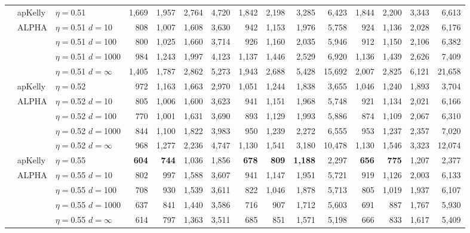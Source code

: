 \documentclass[aoas]{imsart}
\begin{document}
\begin{table}
\begin{tabular}{lll|rrrr|rrrr|rrrr}
\cline{2-15} & apKelly & $\eta=$0.51 & 1,669  & 1,957  & 2,764  & 4,720  & 1,842  & 2,198  & 3,285  & 6,423  & 1,844  & 2,200  & 3,343  & 6,613  \\
\cline{2-15}
& ALPHA & $\eta=$0.51 $d=$10 & 808  & 1,007  & 1,608  & 3,630  & 942  & 1,153  & 1,976  & 5,758  & 924  & 1,136  & 2,028  & 6,176  \\
&  & $\eta=$0.51 $d=$100 & 800  & 1,025  & 1,660  & 3,714  & 926  & 1,160  & 2,035  & 5,946  & 912  & 1,150  & 2,106  & 6,382  \\
&  & $\eta=$0.51 $d=$1000 & 984  & 1,243  & 1,997  & 4,123  & 1,137  & 1,446  & 2,529  & 6,920  & 1,136  & 1,439  & 2,626  & 7,409  \\
 &  & $\eta=$0.51 $d=\infty$ & 1,405  & 1,787  & 2,862  & 5,273  & 1,943  & 2,688  & 5,428  & 15,692  & 2,007  & 2,825  & 6,121  & 21,658  \\
\cline{2-15} & apKelly & $\eta=$0.52 & 972  & 1,163  & 1,663  & 2,970  & 1,051  & 1,244  & 1,838  & 3,655  & 1,046  & 1,240  & 1,893  & 3,704  \\
\cline{2-15}
& ALPHA & $\eta=$0.52 $d=$10 & 805  & 1,006  & 1,600  & 3,623  & 941  & 1,151  & 1,968  & 5,748  & 921  & 1,134  & 2,021  & 6,166  \\
&  & $\eta=$0.52 $d=$100 & 770  & 1,001  & 1,631  & 3,690  & 893  & 1,129  & 1,993  & 5,886  & 874  & 1,109  & 2,067  & 6,310  \\
&  & $\eta=$0.52 $d=$1000 & 844  & 1,100  & 1,822  & 3,983  & 950  & 1,239  & 2,272  & 6,555  & 953  & 1,237  & 2,357  & 7,020  \\
 &  & $\eta=$0.52 $d=\infty$ & 968  & 1,277  & 2,236  & 4,747  & 1,130  & 1,541  & 3,180  & 10,478  & 1,130  & 1,546  & 3,323  & 12,074  \\
\cline{2-15} & apKelly & $\eta=$0.55 & \bf{604}  & \bf{744}  & 1,036  & 1,856  & \bf{678}  & \bf{809}  & \bf{1,188}  & 2,297  & \bf{656}  & \bf{775}  & 1,207  & 2,377  \\
\cline{2-15}
& ALPHA & $\eta=$0.55 $d=$10 & 802  & 997  & 1,588  & 3,607  & 941  & 1,147  & 1,951  & 5,721  & 919  & 1,126  & 2,003  & 6,133  \\
&  & $\eta=$0.55 $d=$100 & 708  & 930  & 1,539  & 3,611  & 822  & 1,046  & 1,878  & 5,713  & 805  & 1,019  & 1,937  & 6,107  \\
&  & $\eta=$0.55 $d=$1000 & 637  & 841  & 1,440  & 3,586  & 716  & 907  & 1,712  & 5,603  & 691  & 887  & 1,767  & 5,930  \\
 &  & $\eta=$0.55 $d=\infty$ & 614  & 797  & 1,363  & 3,511  & 685  & 851  & 1,571  & 5,198  & 666  & 833  & 1,617  & 5,409  \\

\end{tabular}
\end{table}
\end{document}
